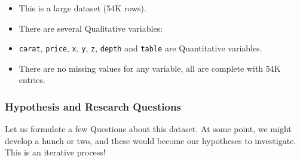 \documentclass[
  letterpaper,
  DIV=11,
  numbers=noendperiod,
  oneside]{scrartcl}
\providecommand{\tightlist}{%
  \setlength{\itemsep}{0pt}\setlength{\parskip}{0pt}}
\begin{document}
\begin{tcolorbox}[enhanced jigsaw, title=\textcolor{quarto-callout-note-color}{\faInfo}\hspace{0.5em}{Business Insights on Examining the \texttt{diamonds} dataset}, coltitle=black, colbacktitle=quarto-callout-note-color!10!white, colframe=quarto-callout-note-color-frame, breakable, arc=.35mm, opacityback=0, left=2mm, toptitle=1mm, toprule=.15mm, opacitybacktitle=0.6, bottomtitle=1mm, rightrule=.15mm, titlerule=0mm, bottomrule=.15mm, leftrule=.75mm, colback=white]

\begin{itemize}
\tightlist
\item
  This is a large dataset (54K rows).
\item
  There are several Qualitative variables:
\item
  \texttt{carat}, \texttt{price}, \texttt{x}, \texttt{y}, \texttt{z},
  \texttt{depth} and \texttt{table} are Quantitative variables.
\item
  There are no missing values for any variable, all are complete with
  54K entries.
\end{itemize}

\end{tcolorbox}

\subsubsection{\texorpdfstring{ Hypothesis and Research
Questions}{ Hypothesis and Research Questions}}\label{hypothesis-and-research-questions}

Let us formulate a few Questions about this dataset. At some point, we
might develop a hunch or two, and these would become our hypotheses to
investigate. This is an iterative process!
\end{document}
